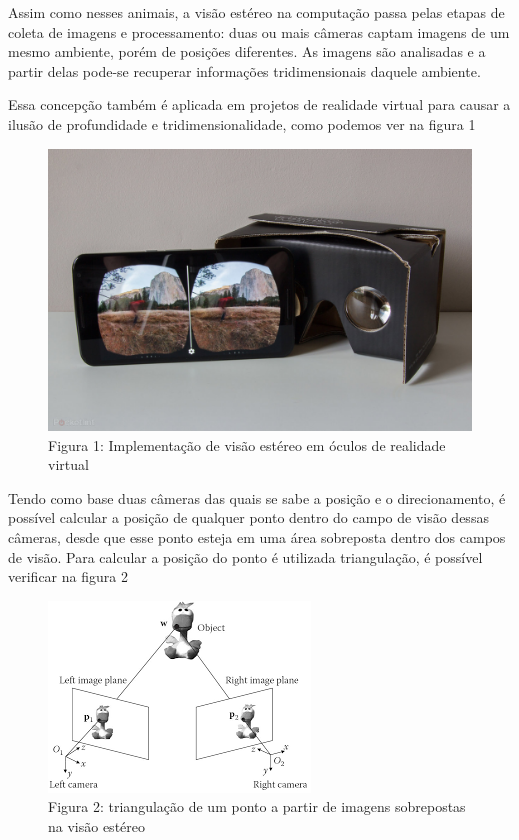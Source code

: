 \documentclass[portuguese]{sbrt}
\begin{document}
\newline
Assim como nesses animais, a visão estéreo na computação passa pelas etapas de coleta de imagens e processamento: duas ou mais câmeras captam imagens de um mesmo ambiente, porém de posições diferentes. As imagens são analisadas e a partir delas pode-se recuperar informações tridimensionais daquele ambiente.
 
\newline
Essa concepção também é aplicada em projetos de realidade virtual para causar a ilusão de profundidade e tridimensionalidade, como podemos ver na figura 1
\begin{figure}
    \begin{center}
        \centering
	    \includegraphics[scale=0.8]{vr}
	    \caption{Figura 1: Implementação de visão estéreo em óculos de realidade virtual}        
    \end{center}
\end{figure}

\newline
Tendo como base duas câmeras das quais se sabe a posição e o direcionamento, é possível calcular a posição de qualquer ponto dentro do campo de visão dessas câmeras, desde que esse ponto esteja em uma área sobreposta dentro dos campos de visão. Para calcular a posição do ponto é utilizada triangulação, é possível  verificar na figura 2

\begin{figure}
    \begin{center}
        \centering
	    \includegraphics[scale=1.0]{triangulação}
	    \caption{Figura 2: triangulação de um ponto a partir de imagens sobrepostas na visão estéreo}        
    \end{center}
\end{figure}
\end{document}
